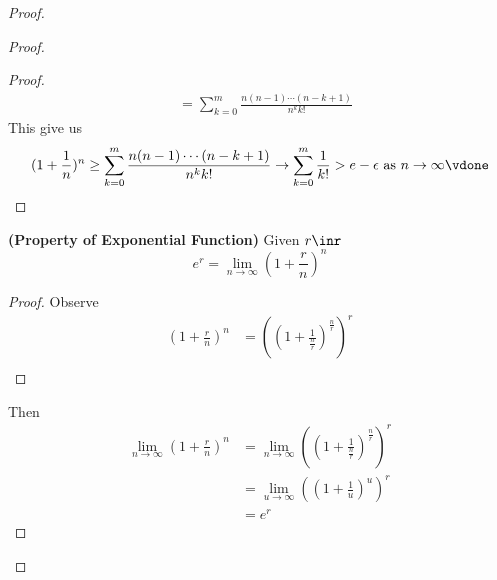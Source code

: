\documentclass{report}
\begin{document}
\begin{proof}
\begin{proof}
\begin{proof}
\begin{align}
  &=\sum_{k=0}^m \frac{n(n-1)\cdots (n-k+1)}{n^k k!}
\end{align}
This give us  
\begin{equation*}
  (1+\frac{1}{n})^n\geq \sum_{k=0}^m \frac{n(n-1)\cdots (n-k+1)}{n^kk!}\to \sum_{k=0}^m \frac{1}{k!}>e-\epsilon \text{ as }n\to \infty \vdone
\end{equation*}
\end{proof}
\begin{theorem}
\label{4.5.6}
\textbf{(Property of Exponential Function)} Given $r\inr$
\begin{equation*}
 e^r=\lim_{n\to \infty}(1+\frac{r}{n})^n 
\end{equation*}
\end{theorem}
\begin{proof}
Observe 
\begin{align*}
  (1+\frac{r}{n})^n&= ((1+\frac{1}{ \frac{n}{r}})^\frac{n}{r})^r\\
\end{align*}
\end{proof}
Then 
\begin{align*}
\lim_{n \to \infty} (1+\frac{r}{n})^n &= \lim_{n\to \infty}((1+\frac{1}{\frac{n}{r}})^{\frac{n}{r}})^r\\
&=\lim_{u \to \infty}((1+\frac{1}{u})^u)^r\\
&=e^r
\end{align*}




\end{proof}
\end{proof}
\end{document}
